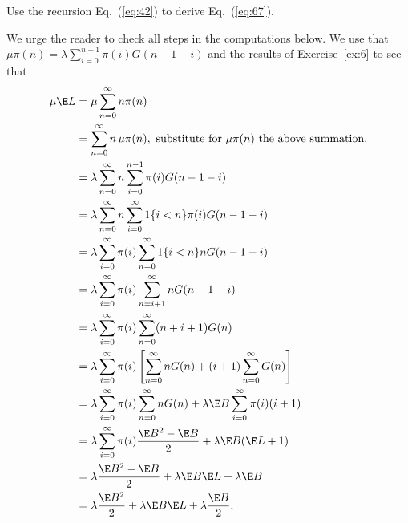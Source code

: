 \begin{question}\label{ex:7}
Use the recursion Eq.~(\ref{eq:42}) to derive Eq.~(\ref{eq:67}). 
\begin{solution}
  We urge the reader to check all steps in the computations below.  We
  use that $\mu \pi(n) =\lambda \sum_{i=0}^{n-1} \pi(i) G(n-1-i)$ and the
  results of Exercise~\ref{ex:6} to see that
\begin{align*}
  \mu \E L
  &=\mu \sum_{n=0}^\infty n \pi(n) \\
  &=\sum_{n=0}^\infty n\, \mu \pi(n), \text{ substitute for $\mu \pi(n)$ the above summation}, \\
& =\lambda \sum_{n=0}^\infty n \sum_{i=0}^{n-1} \pi(i) G(n-1-i) \\
  &=\lambda \sum_{n=0}^\infty n \sum_{i=0}^\infty 1\{i<n\} \pi(i) G(n-1-i) \\
& =\lambda \sum_{i=0}^\infty \pi(i) \sum_{n=0}^\infty 1\{i<n\} n G(n-1-i) \\
  &=\lambda \sum_{i=0}^\infty \pi(i) \sum_{n=i+1}^\infty n G(n-1-i) \\
& =\lambda \sum_{i=0}^\infty \pi(i) \sum_{n=0}^\infty (n+i+1) G(n) \\
  &=\lambda \sum_{i=0}^\infty \pi(i) \left[\sum_{n=0}^\infty n G(n) +(i+1) \sum_{n=0}^\infty G(n)\right]  \\
  &=\lambda \sum_{i=0}^\infty \pi(i)\sum_{n=0}^\infty n G(n) +\lambda  \E B \sum_{i=0}^\infty \pi(i) (i+1)  \\ 
  &=\lambda \sum_{i=0}^\infty \pi(i) \frac{\E B^2 -\E B}2  + \lambda \E B (\E L +1)  \\ 
  &= \lambda \frac{\E B^2 -\E B}2  + \lambda \E B \E L +\lambda \E B \\
  &= \lambda \frac{\E B^2 }2  + \lambda \E B \E L +\lambda \frac{\E B}2,
\end{align*}
\end{solution}
\end{question}

